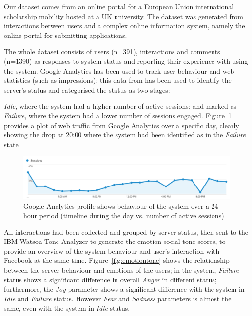\documentclass[graybox]{svmult}
\begin{document}
Our dataset comes from an online portal for a European Union 
international scholarship mobility hosted at a UK university. The
dataset was generated from interactions between users and a complex
online information system, namely the online portal for submitting
applications.

The whole dataset consists of users (n=391), interactions and comments
(n=1390) as responses to system status and reporting their experience
with using the system. Google Analytics has been used to track user behaviour
and web statistics (such as impressions); this data from has been used
to identify the server's status and categorised the status as two
stages: {\emph{Idle}, where the system had a higher number of active
sessions; and marked as {\emph{Failure}}, where the system had a lower
number of sessions engaged. Figure~\ref{fig:googleanalytics} provides
a plot of web traffic from Google Analytics over a specific day, clearly
showing the drop at 20:00 where the system had been identified as in
the {\emph{Failure}} state.

\begin{figure}[!ht]
\centering
\includegraphics[width=\columnwidth]{images/googleanalytics}
\caption{Google Analytics profile shows behaviour of the system over a
  24 hour period (timeline during the day vs. number of active sessions)}
\label{fig:googleanalytics} 
\end{figure}

All interactions had been collected and grouped by server status, then
sent to the IBM Watson Tone Analyzer to generate the emotion social
tone scores, to provide an overview of the system behaviour and user’s
interaction with Facebook at the same
time. Figure~\ref{fig:emotiontone} shows the relationship between the
server behaviour and emotions of the users; in the system,
{\emph{Failure}} status shows a significant difference in overall
{\emph{Anger}} in different status; furthermore, the {\emph{Joy}}
parameter shows a significant difference with the system in
{\emph{Idle}} and {\emph{Failure}} status. However {\emph{Fear}} and
{\emph{Sadness}} parameters is almost the same, even with the system in
{\emph{Idle}} status.

}
\end{document}
